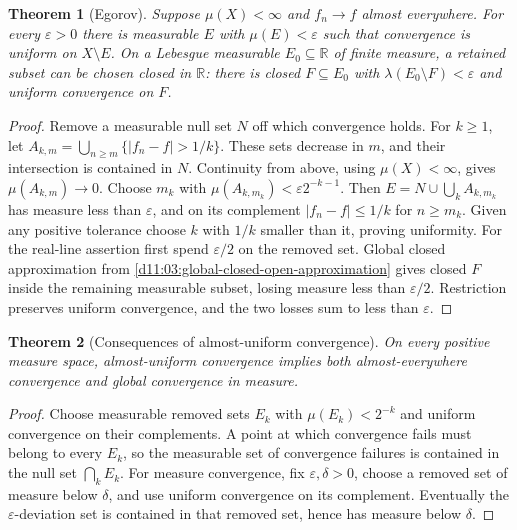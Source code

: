 \documentclass[11pt,oneside,openany]{book}
\newtheorem{theorem}{Theorem}[chapter]
\theoremstyle{definition}
\theoremstyle{remark}
\newcommand{\R}{\mathbb R}\newcommand{\C}{\mathbb C}
\newcommand{\eps}{\varepsilon}\newcommand{\ee}{\varepsilon}
\newcommand{\family}[1]{}
\begin{document}
\begin{theorem}[Egorov]
\family{D11.07.egorov}\label{d11:07:egorov}
Suppose $\mu(X)<\infty$ and $f_n\to f$ almost everywhere. For every
$\eps>0$ there is measurable $E$ with $\mu(E)<\eps$ such that convergence
is uniform on $X\setminus E$. On a Lebesgue measurable $E_0\subseteq\R$
of finite measure, a retained subset can be chosen closed in $\R$:
there is closed $F\subseteq E_0$ with $\lambda(E_0\setminus F)<\eps$
and uniform convergence on $F$.
\end{theorem}
\begin{proof}
Remove a measurable null set $N$ off which convergence holds. For
$k\geq1$, let
$A_{k,m}=\bigcup_{n\geq m}\{|f_n-f|>1/k\}$. These sets decrease in $m$,
and their intersection is contained in $N$. Continuity from above,
using $\mu(X)<\infty$, gives $\mu(A_{k,m})\to0$.
Choose $m_k$ with $\mu(A_{k,m_k})<\eps 2^{-k-1}$. Then
$E=N\cup\bigcup_kA_{k,m_k}$ has measure less than $\eps$, and on its
complement $|f_n-f|\leq1/k$ for $n\geq m_k$. Given any positive
tolerance choose $k$ with $1/k$ smaller than it, proving uniformity.
For the real-line assertion first spend $\eps/2$ on the removed set.
Global closed approximation from \cref{d11:03:global-closed-open-approximation}
gives closed $F$ inside the remaining measurable subset, losing measure
less than $\eps/2$. Restriction preserves uniform convergence, and the
two losses sum to less than $\eps$.
\end{proof}

\begin{theorem}[Consequences of almost-uniform convergence]
\family{D11.07.almost_uniform_implications}\label{d11:07:almost-uniform-implications}
On every positive measure space, almost-uniform convergence implies both
almost-everywhere convergence and global convergence in measure.
\end{theorem}
\begin{proof}
Choose measurable removed sets $E_k$ with $\mu(E_k)<2^{-k}$ and uniform
convergence on their complements. A point at which convergence fails must
belong to every $E_k$, so the measurable set of convergence failures is
contained in the null set $\bigcap_kE_k$. For measure convergence, fix
$\eps,\delta>0$, choose a removed set of measure below $\delta$, and use
uniform convergence on its complement. Eventually the $\eps$-deviation
set is contained in that removed set, hence has measure below $\delta$.
\end{proof}
\end{document}
